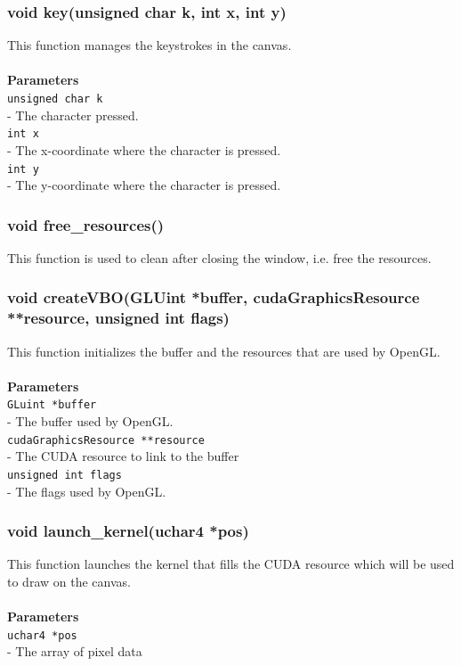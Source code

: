 \documentclass[a4paper, 10pt]{article}
\def\mar{\hspace*{5mm}}
\begin{document}
        \subsubsection{void key(unsigned char k, int x, int y)}
        This function manages the keystrokes in the canvas.\\
        \\{\bf Parameters}\\
        \verb|unsigned char k|\\\mar- The character pressed.\\
        \verb|int x|\\\mar- The x-coordinate where the character is pressed.\\
        \verb|int y|\\\mar- The y-coordinate where the character is pressed.

        \vspace{1cm}
        \subsubsection{void free\_resources()}
        This function is used to clean after closing the window, i.e. free the resources.

        \vspace{1cm}
        \subsubsection{void createVBO(GLUint *buffer, cudaGraphicsResource **resource,
            unsigned int flags)}
        This function initializes the buffer and the resources that are used by OpenGL.\\
        \\{\bf Parameters}\\
        \verb|GLuint *buffer|\\\mar- The buffer used by OpenGL.\\
        \verb|cudaGraphicsResource **resource|\\\mar- The CUDA resource to link to the buffer\\
        \verb|unsigned int flags|\\\mar- The flags used by OpenGL.

        \vspace{1cm}
        \subsubsection{void launch\_kernel(uchar4 *pos)}
        This function launches the kernel that fills the CUDA resource which will be used
        to draw on the canvas.\\
        \\{\bf Parameters}\\
        \verb|uchar4 *pos|\\\mar- The array of pixel data
\end{document}
